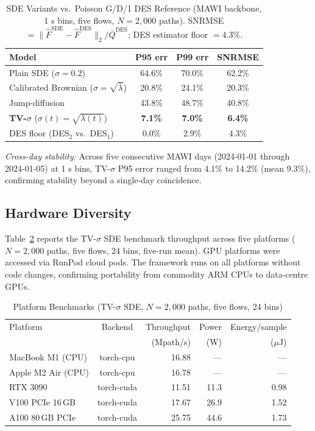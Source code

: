 \documentclass[journal]{IEEEtran}
\begin{document}
\begin{table}[!t]
\caption{SDE Variants vs.\ Poisson G/D/1 DES Reference (MAWI backbone, 1 s bins, five flows,
$N=2{,}000$ paths). SNRMSE $= \|\hat{F}^{\mathrm{SDE}}-\hat{F}^{\mathrm{DES}}\|_2 /
\bar{Q}^{\mathrm{DES}}$; DES estimator floor $=4.3\%$.}
\label{tab:sde_des_comparison}
\centering\small
\begin{tabular}{@{}l c c c@{}}
\toprule
Model & P95 err & P99 err & SNRMSE \\
\midrule
Plain SDE ($\sigma=0.2$) & 64.6\% & 70.0\% & 62.2\% \\
Calibrated Brownian ($\sigma=\sqrt{\bar\lambda}$) & 20.8\% & 24.1\% & 20.3\% \\
Jump-diffusion & 43.8\% & 48.7\% & 40.8\% \\
\textbf{TV-$\sigma$} ($\sigma(t)=\sqrt{\lambda(t)}$) & \textbf{7.1\%} & \textbf{7.0\%} & \textbf{6.4\%} \\
\midrule
DES floor (DES$_2$ vs.\ DES$_1$) & 0.0\% & 2.9\% & 4.3\% \\
\bottomrule
\end{tabular}
\end{table}

\textit{Cross-day stability:}
Across five consecutive MAWI days (2024-01-01 through 2024-01-05) at 1 s bins,
TV-$\sigma$ P95 error ranged from 4.1\% to 14.2\% (mean 9.3\%), confirming stability beyond a
single-day coincidence.

\subsection{Hardware Diversity}
\label{subsec:hardware_diversity}

Table~\ref{tab:hardware_diversity} reports the TV-$\sigma$ SDE benchmark throughput across
five platforms ($N=2{,}000$ paths, five flows, 24 bins, five-run mean). GPU platforms were
accessed via RunPod cloud pods. The framework runs on all platforms without code changes,
confirming portability from commodity ARM CPUs to data-centre GPUs.

\begin{table}[!t]
\caption{Platform Benchmarks (TV-$\sigma$ SDE, $N=2{,}000$ paths, five flows, 24 bins)}
\label{tab:hardware_diversity}
\centering
\begin{tabular}{@{}l c r r r@{}}
\toprule
Platform & Backend & Throughput & Power & Energy/sample \\
         &         & (Mpath/s) & (W) & ($\mu$J) \\
\midrule
MacBook M1 (CPU)  & torch-cpu  & 16.88 & ---  & ---   \\
Apple M2 Air (CPU)& torch-cpu  & 16.78 & ---  & ---   \\
RTX 3090          & torch-cuda & 11.51 & 11.3 & 0.98  \\
V100 PCIe 16\,GB  & torch-cuda & 17.67 & 26.9 & 1.52  \\
A100 80\,GB PCIe  & torch-cuda & 25.75 & 44.6 & 1.73  \\
\bottomrule
\end{tabular}
\end{table}
\end{document}
